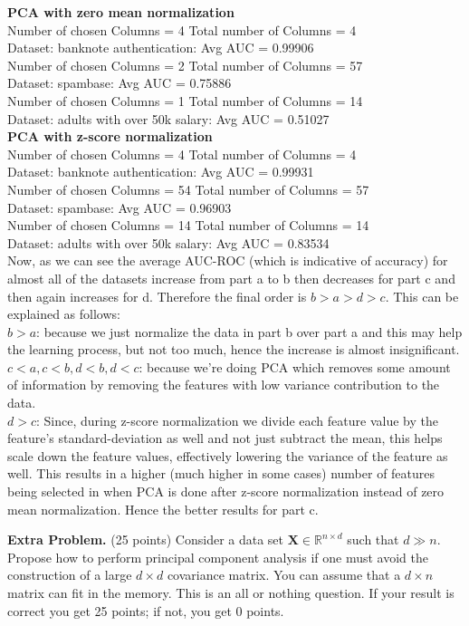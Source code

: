 \documentclass[twoside]{article}
\begin{document}
\textbf{PCA with zero mean normalization}\\
Number of chosen Columns =  4 Total number of Columns =  4\\
Dataset: banknote authentication: Avg AUC = 0.99906\\

Number of chosen Columns =  2 Total number of Columns =  57\\
Dataset: spambase: Avg AUC = 0.75886\\

Number of chosen Columns =  1 Total number of Columns =  14\\
Dataset: adults with over 50k salary: Avg AUC = 0.51027\\


\textbf{PCA with z-score normalization}\\
Number of chosen Columns =  4 Total number of Columns =  4\\
Dataset: banknote authentication: Avg AUC = 0.99931\\

Number of chosen Columns =  54 Total number of Columns =  57\\
Dataset: spambase: Avg AUC = 0.96903\\

Number of chosen Columns =  14 Total number of Columns =  14\\
Dataset: adults with over 50k salary: Avg AUC = 0.83534\\
	
	
Now, as we can see the average AUC-ROC (which is indicative of accuracy) for almost all of the datasets increase from part a to b then decreases for part c and then again increases for d. Therefore the final order is $b > a > d > c$. This can be explained as follows:\\
$b>a$: because we just normalize the data in part b over part a and this may help the learning process, but not too much, hence the increase is almost insignificant. \\
$c < a, c < b, d < b, d < c$: because we're doing PCA which removes some amount of information by removing the features with low variance contribution to the data.\\
$d > c$: Since, during z-score normalization we divide each feature value by the feature's standard-deviation as well and not just subtract the mean, this helps scale down the feature values, effectively lowering the variance of the feature as well. This results in a higher (much higher in some cases) number of features being selected in when PCA is done after z-score normalization instead of zero mean normalization. Hence the better results for part c.



\textbf{Extra Problem.} (25 points) Consider a data set $\mathbf{X}\in\mathbb{R}^{n\times d}$ such that $d\gg n$. Propose how to perform principal component analysis if one must avoid the construction of a large $d\times d$ covariance matrix. You can assume that a $d \times n$ matrix can fit in the memory. This is an all or nothing question. If your result is correct you get 25 points; if not, you get 0 points.
\end{document}
